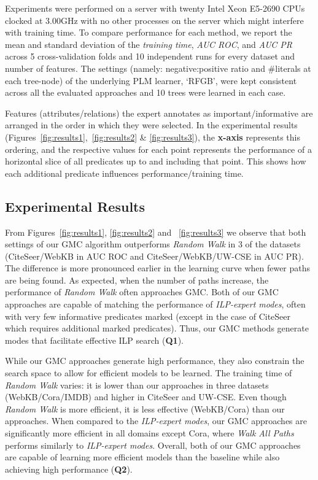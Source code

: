 \documentclass[sigconf]{acmart}
\begin{document}
Experiments were performed on a server with twenty Intel Xeon E5-2690 CPUs clocked at 3.00GHz with no other processes on the server which might interfere with training time. To compare performance for each method, we report the mean and standard deviation of the \textit{training time}, \textit{AUC ROC}, and \textit{AUC PR} across 5 cross-validation folds and 10 independent runs for every dataset and number of features. The settings (namely: negative:positive ratio and \#literals at each tree-node) of the underlying PLM learner, `RFGB', were kept consistent across all the evaluated approaches and 10 trees were learned in each case.

Features (attributes/relations) the expert annotates as important/informative are arranged in the order in which they were selected. In the experimental results (Figures~\ref{fig:results1},~\ref{fig:results2} \& \ref{fig:results3}), the \textbf{x-axis} represents this ordering, and the respective values for each point represents the performance of a horizontal slice of all predicates up to and including that point. This shows how each additional predicate influences performance/training time.

\subsection{Experimental Results}


From Figures~\ref{fig:results1}, \ref{fig:results2} and ~\ref{fig:results3} we observe that both settings of our \textsc{GMC} algorithm outperforms \textit{Random Walk} in 3 of the datasets (CiteSeer/WebKB in AUC ROC and CiteSeer/WebKB/UW-CSE in AUC PR). The difference is more pronounced earlier in the learning curve when fewer paths are being found.  As expected, when the number of paths increase, the performance of \textit{Random Walk} often approaches \textsc{GMC}. Both of our \textsc{GMC} approaches are capable of matching the performance of \textit{ILP-expert modes}, often with very few informative predicates marked (except in the case of CiteSeer which requires additional marked predicates). Thus, our \textsc{GMC} methods generate modes that facilitate effective ILP search (\textbf{Q1}).


While our \textsc{GMC} approaches generate high performance, they also constrain the search space to allow for efficient models to be learned. The training time of \textit{Random Walk} varies: it is lower than our approaches in three datasets (WebKB/Cora/IMDB) and higher in CiteSeer and UW-CSE. Even though \textit{Random Walk} is more efficient, it is less effective (WebKB/Cora) than our approaches. When compared to the \textit{ILP-expert modes}, our \textsc{GMC} approaches are significantly more efficient in all domains except Cora, where \textit{Walk All Paths} performs similarly to \textit{ILP-expert modes}. Overall, both of our \textsc{GMC} approaches are capable of learning more efficient models than the baseline while also achieving high performance (\textbf{Q2}).
\end{document}
